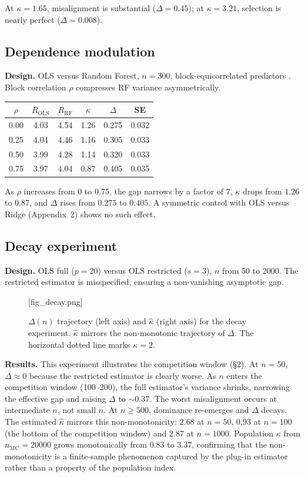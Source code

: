 \documentclass[lineno]{biometrika}
\begin{document}
At $\kappa = 1.65$, misalignment is substantial ($\Delta = 0.45$); at $\kappa = 3.21$, selection is nearly perfect ($\Delta = 0.008$).

\subsection{Dependence modulation}

\textbf{Design.} OLS versus Random Forest, $n = 300$, block-equicorrelated predictors \citep{Hastie:2009}. Block correlation $\rho$ compresses RF variance asymmetrically.

\begin{table}
{\begin{tabular}{cccccc}
$\rho$ & $R_{\text{OLS}}$ & $R_{\text{RF}}$ & $\hat\kappa$ & $\Delta$ & SE \\ \hline
0.00 & 4.03 & 4.54 & 1.26 & 0.275 & 0.032 \\
0.25 & 4.04 & 4.46 & 1.16 & 0.305 & 0.033 \\
0.50 & 3.99 & 4.28 & 1.14 & 0.320 & 0.033 \\
0.75 & 3.97 & 4.04 & 0.87 & 0.405 & 0.035
\end{tabular}}
\label{tab:dep}
\end{table}

As $\rho$ increases from $0$ to $0.75$, the gap narrows by a factor of $7$, $\kappa$ drops from $1.26$ to $0.87$, and $\Delta$ rises from $0.275$ to $0.405$. A symmetric control with OLS versus Ridge (Appendix~2) shows no such effect.

\subsection{Decay experiment}

\textbf{Design.} OLS full ($p=20$) versus OLS restricted ($s=3$), $n$ from 50 to 2000. The restricted estimator is misspecified, ensuring a non-vanishing asymptotic gap.

\begin{figure}
\figurebox{15pc}{20pc}{}[fig_decay.png]
\caption{$\Delta(n)$ trajectory (left axis) and $\hat\kappa$ (right axis) for the decay experiment. $\hat\kappa$ mirrors the non-monotonic trajectory of $\Delta$. The horizontal dotted line marks $\kappa=2$.}
\label{fig:decay}
\end{figure}

\textbf{Results.} This experiment illustrates the competition window (\S2). At $n=50$, $\Delta \approx 0$ because the restricted estimator is clearly worse. As $n$ enters the competition window (100--200), the full estimator's variance shrinks, narrowing the effective gap and raising $\Delta$ to $\sim 0.37$. The worst misalignment occurs at intermediate $n$, not small $n$. At $n \geq 500$, dominance re-emerges and $\Delta$ decays. The estimated $\hat\kappa$ mirrors this non-monotonicity: $2.68$ at $n=50$, $0.93$ at $n=100$ (the bottom of the competition window) and $2.87$ at $n=1000$. Population $\kappa$ from $n_{\text{MC}} = 20000$ grows monotonically from $0.83$ to $3.37$, confirming that the non-monotonicity is a finite-sample phenomenon captured by the plug-in estimator rather than a property of the population index.
\end{document}
